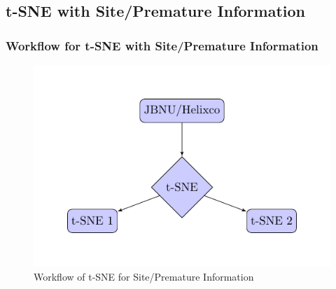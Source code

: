 \documentclass{beamer}
\begin{document}
    \subsection{t-SNE with Site/Premature Information}
    \begin{frame}
        \frametitle{Workflow for t-SNE with Site/Premature Information}

        \begin{figure}
            \includegraphics[width=0.6 \linewidth]{figures/tikz/site.pdf}
            \caption{Workflow of t-SNE for Site/Premature Information}
        \end{figure}
    \end{frame}
\end{document}
